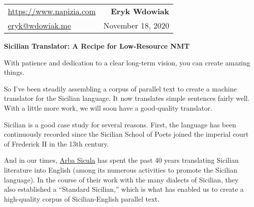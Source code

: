 \documentclass[10pt,letterpaper]{article}
\begin{document}

\thispagestyle{empty}

\hypertarget{intro}{}


\begin{tabularx}{\textwidth}{X r}
  \href{https://www.napizia.com}{https://www.napizia.com}    &  \large{\textbf{Eryk Wdowiak}}\\
  \href{mailto:eryk@wdowiak.me}{eryk@wdowiak.me}  &  November 18, 2020
\end{tabularx}


\begin{center}
  \Large{\textbf{Sicilian Translator: %
  A Recipe for Low-Resource NMT}}
\end{center}



With patience and dedication to a clear long-term vision, you can create amazing things.

So I've been steadily assembling a corpus of parallel text to create a machine translator for the Sicilian language. 
It now translates simple sentences fairly well. With a little more work, we will soon have a good-quality translator.

Sicilian is a good case study for several reasons. First, the language has been continuously recorded since the 
Sicilian School of Poets joined the imperial court of Frederick II in the 13th century.

And in our times, \href{https://www.arbasicula.org/}{Arba Sicula}
has spent the past 40 years translating Sicilian literature into English
(among its numerous activities to promote the Sicilian language).
In the course of their work with the many dialects of Sicilian, they also established a ``Standard Sicilian,''
which is what has enabled us to create a high-quality corpus of Sicilian-English parallel text.
\end{document}
